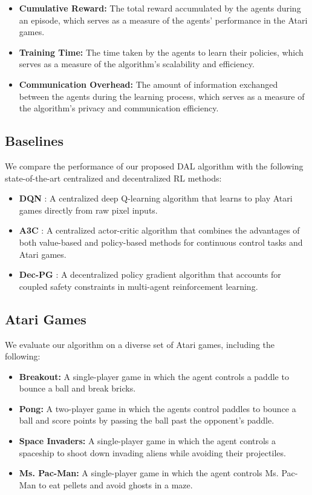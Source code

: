 \begin{itemize}
    \item \textbf{Cumulative Reward:} The total reward accumulated by the agents during an episode, which serves as a measure of the agents' performance in the Atari games.
    \item \textbf{Training Time:} The time taken by the agents to learn their policies, which serves as a measure of the algorithm's scalability and efficiency.
    \item \textbf{Communication Overhead:} The amount of information exchanged between the agents during the learning process, which serves as a measure of the algorithm's privacy and communication efficiency.
\end{itemize}

\subsection{Baselines}

We compare the performance of our proposed DAL algorithm with the following state-of-the-art centralized and decentralized RL methods:

\begin{itemize}
    \item \textbf{DQN} \citep{mnih2013playing}: A centralized deep Q-learning algorithm that learns to play Atari games directly from raw pixel inputs.
    \item \textbf{A3C} \citep{mnih2016asynchronous}: A centralized actor-critic algorithm that combines the advantages of both value-based and policy-based methods for continuous control tasks and Atari games.
    \item \textbf{Dec-PG} \citep{lu2021decentralized}: A decentralized policy gradient algorithm that accounts for coupled safety constraints in multi-agent reinforcement learning.
\end{itemize}

\subsection{Atari Games}

We evaluate our algorithm on a diverse set of Atari games, including the following:

\begin{itemize}
    \item \textbf{Breakout:} A single-player game in which the agent controls a paddle to bounce a ball and break bricks.
    \item \textbf{Pong:} A two-player game in which the agents control paddles to bounce a ball and score points by passing the ball past the opponent's paddle.
    \item \textbf{Space Invaders:} A single-player game in which the agent controls a spaceship to shoot down invading aliens while avoiding their projectiles.
    \item \textbf{Ms. Pac-Man:} A single-player game in which the agent controls Ms. Pac-Man to eat pellets and avoid ghosts in a maze.
\end{itemize}

